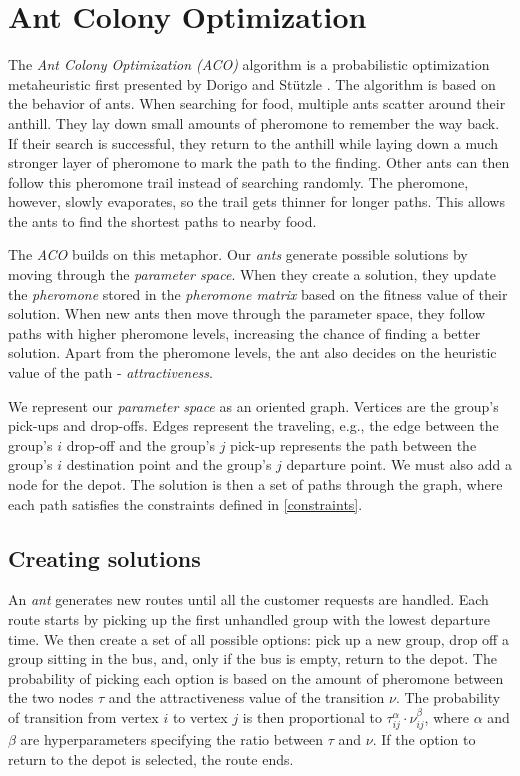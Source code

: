 
\chapter{Ant Colony Optimization}

The \textit{Ant Colony Optimization (ACO)} algorithm is a probabilistic optimization metaheuristic first presented by Dorigo and Stützle \cite{Dorigo2010}. The algorithm is based on the behavior of ants. When searching for food, multiple ants scatter around their anthill. They lay down small amounts of pheromone to remember the way back. If their search is successful, they return to the anthill while laying down a much stronger layer of pheromone to mark the path to the finding. Other ants can then follow this pheromone trail instead of searching randomly. The pheromone, however, slowly evaporates, so the trail gets thinner for longer paths. This allows the ants to find the shortest paths to nearby food.

The \textit{ACO} builds on this metaphor. Our \textit{ants} generate possible solutions by moving through the \textit{parameter space}. When they create a solution, they update the \textit{pheromone} stored in the \textit{pheromone matrix} based on the fitness value of their solution. When new ants then move through the parameter space, they follow paths with higher pheromone levels, increasing the chance of finding a better solution. Apart from the pheromone levels, the ant also decides on the heuristic value of the path - \textit{attractiveness}.

We represent our \textit{parameter space} as an oriented graph. Vertices are the group's pick-ups and drop-offs. Edges represent the traveling, e.g., the edge between the group’s $i$ drop-off and the group’s $j$ pick-up represents the path between the group’s $i$ destination point and the group’s $j$ departure point. We must also add a node for the depot. The solution is then a set of paths through the graph, where each path satisfies the constraints defined in \ref{constraints}.

\section{Creating solutions}

An \textit{ant} generates new routes until all the customer requests are handled. Each route starts by picking up the first unhandled group with the lowest departure time. We then create a set of all possible options: pick up a new group, drop off a group sitting in the bus, and, only if the bus is empty, return to the depot. The probability of picking each option is based on the amount of pheromone between the two nodes $\tau$ and the attractiveness value of the transition $\nu$. The probability of transition from vertex $i$ to vertex $j$ is then proportional to $\tau_{ij}^\alpha \cdot \nu_{ij}^\beta$, where $\alpha$ and $\beta$ are hyperparameters specifying the ratio between $\tau$ and $\nu$. If the option to return to the depot is selected, the route ends.

